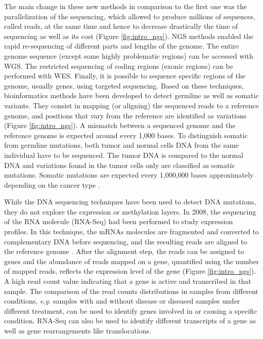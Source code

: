 The main change in these new methods in comparison to the first one was the parallelization of the sequencing, which allowed to produce millions of sequences, called reads, at the same time and hence to decrease drastically the time of sequencing as well as its cost \cite{Wetterstrand} (Figure \ref{fig:intro_ngs}). 
\gls{NGS} methods enabled the rapid re-sequencing of different parts and lengths of the genome. The entire genome sequence (except some highly problematic regions) can be accessed with \gls{WGS}. The restricted sequencing of coding regions (exonic regions) can be performed with \gls{WES}. Finally, it is possible to sequence specific regions of the genome, usually genes, using targeted sequencing. 
Based on these techniques, bioinformatics methods have been developed to detect germline as well as somatic variants. They consist in mapping (or aligning) the sequenced reads to a reference genome, and positions that vary from the reference are identified as variations (Figure \ref{fig:intro_ngs}). A mismatch between a sequenced genome and the reference genome is expected around every 1,000 bases. To distinguish somatic from germline mutations, both tumor and normal cells \gls*{DNA} from the same individual have to be sequenced. The tumor \gls*{DNA} is compared to the normal \gls*{DNA} and variations found in the tumor cells only are classified as somatic mutations. Somatic mutations are expected every 1,000,000 bases approximately depending on the cancer type \cite{Alexandrov2013}. 

While the \gls*{DNA} sequencing techniques have been used to detect \gls*{DNA} mutations, they do not explore the expression or methylation layers.
In 2008, the sequencing of the \gls*{RNA} molecule (\gls{RNA-Seq}) had been performed to study expression profiles. In this technique, the \gls{mRNAs} molecules are fragmented and converted to complementary \gls*{DNA} before sequencing, and the resulting reads are aligned to the reference genome \cite{Wang2009}. After the alignment step, the reads can be assigned to genes and the abundance of reads mapped on a gene, quantified using the number of mapped reads, reflects the expression level of the gene (Figure \ref{fig:intro_ngs}). A high read count value indicating that a gene is active and transcribed in that sample. The comparison of the read counts distributions in samples from different conditions, \textit{e.g.} samples with and without disease or diseased samples under different treatment, can be used to identify genes involved in or causing a specific condition. \gls{RNA-Seq} can also be used to identify different transcripts of a gene as well as gene rearrangements like translocations. 

